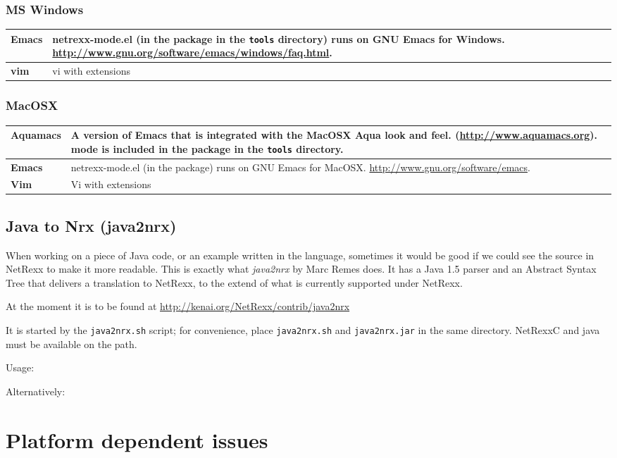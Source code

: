{{\subsection{MS Windows}
\begin{tabularx}{\textwidth}{>{\bfseries}lX}
\toprule
Emacs & netrexx-mode.el (in the \nr{} package in the \texttt{tools} directory) runs on GNU Emacs for
Windows. \url{http://www.gnu.org/software/emacs/windows/faq.html}.
\\\midrule
vim & vi with extensions
\\\bottomrule
\end{tabularx}
\subsection{MacOSX}
\begin{tabularx}{\textwidth}{>{\bfseries}lX}
\toprule
Aquamacs & A version of Emacs that is integrated with the MacOSX Aqua
look and feel. (\url{http://www.aquamacs.org}). \nr{} mode is
included in the \nr{} package in the \texttt{tools} directory.
\\\midrule
Emacs & netrexx-mode.el (in the \nr{} package) runs on GNU Emacs for
MacOSX. \url{http://www.gnu.org/software/emacs}.
\\\midrule
Vim & Vi with extensions
\\\bottomrule
\end{tabularx}
\section{Java to Nrx (java2nrx)}
When working on a piece of Java code, or an example written in the
language, sometimes it would be good if we could see the source in
NetRexx to make it more readable. This is exactly what \emph{java2nrx}
by Marc Remes does. It has a  Java 1.5 parser and an Abstract Syntax
Tree that delivers a translation to NetRexx, to the
extend of what is currently supported under NetRexx.

At the moment it is to be found at \url{http://kenai.org/NetRexx/contrib/java2nrx}

It is started by the \texttt{java2nrx.sh} script; for convenience, place \texttt{java2nrx.sh} and \texttt{java2nrx.jar} in the
same directory. NetRexxC and java must be available on the path.

Usage:

Alternatively:


\chapter{Platform dependent issues}
}}
